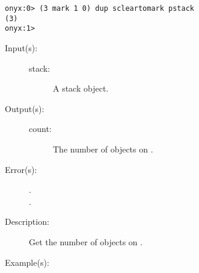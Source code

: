 \begin{description}
\begin{description}
\begin{verbatim}
onyx:0> (3 mark 1 0) dup scleartomark pstack
(3)
onyx:1>
		\end{verbatim}
	\end{description}
\label{systemdict:scount}
\item[{\onyxop{stack}{scount}{count}}: ]
	\begin{description}\item[]
	\item[Input(s): ]
		\begin{description}\item[]
		\item[stack: ]
			A stack object.
		\end{description}
	\item[Output(s): ]
		\begin{description}\item[]
		\item[count: ]
			The number of objects on .
		\end{description}
	\item[Error(s): ]
		\begin{description}\item[]
		\item[.]
		\item[.]
		\end{description}
	\item[Description: ]
		Get the number of objects on .
	\item[Example(s): ]\begin{verbatim}


\end{verbatim}
\end{description}
\end{description}
